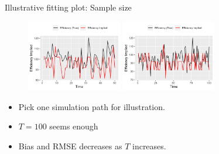 \documentclass[aspectratio=169]{beamer}
\begin{document}
\begin{frame}{Illustrative fitting plot: Sample size}
\begin{figure}[!ht]
  \begin{center}

  \includegraphics[width = 0.37\textwidth]
  {figuretable/illustrative_plot_implied_efficiency_num_time_50_cobb_douglas_0.3_AR1_I0.png}
  \includegraphics[width = 0.37\textwidth]
  {figuretable/illustrative_plot_implied_efficiency_num_time_100_cobb_douglas_0.3_AR1_I0.png}
  \end{center}
  \footnotesize
\end{figure}
\begin{itemize}
     \item Pick one simulation path for illustration.
     \item $T=100$ seems enough
     \item Bias and RMSE decreases as $T$ increases. 
\end{itemize}
\end{frame}
\end{document}
